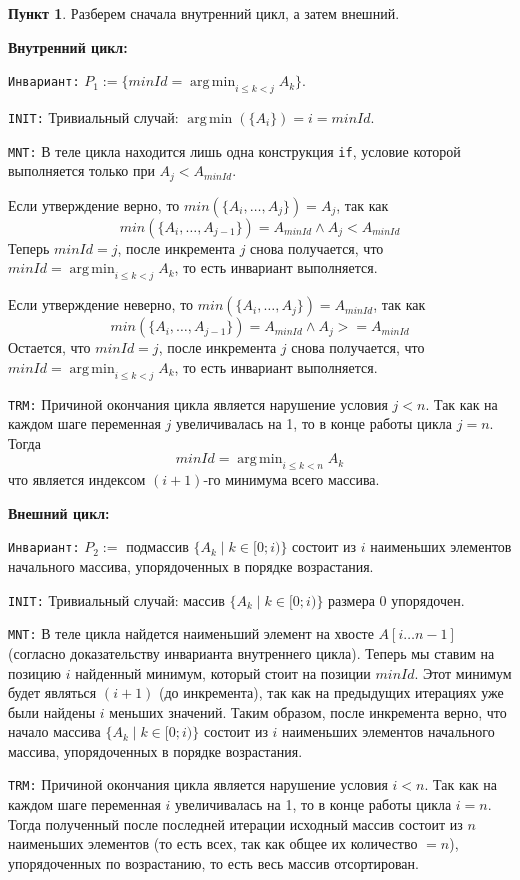 \documentclass[11pt,a4paper]{scrarticle}
\theoremstyle{definition}
\newtheorem{subtask}{Пункт}
\DeclareMathOperator*{\argmin}{arg\,min}
\begin{document}
\begin{subtask}
	Разберем сначала внутренний цикл, а затем внешний.
	
	\textbf{Внутренний цикл:}
	
	\texttt{Инвариант:} $\displaystyle P_{1} := \{minId = \argmin_{i \le k < j} A_k\}$.
	
	\texttt{INIT:} Тривиальный случай: $\argmin (\{A_i\}) = i = minId$.
	
	\texttt{MNT:} В теле цикла находится лишь одна конструкция \texttt{if}, условие которой выполняется только при $A_{j} < A_{minId}$.
	
	Если утверждение верно, то $min(\{A_i, \dots, A_j\}) = A_{j}$, так как
	$$min (\{A_i, \dots, A_{j - 1}\}) = A_{minId} \land A_{j} < A_{minId}$$
	Теперь $minId = j$, после инкремента $j$ снова получается, что $\displaystyle minId = \argmin_{i \le k < j} A_k$, то есть инвариант выполняется.
	
	Если утверждение неверно, то $min(\{A_i, \dots, A_j\}) = A_{minId}$, так как
	$$min (\{A_i, \dots, A_{j - 1}\}) = A_{minId} \land A_{j} >= A_{minId}$$
	Остается, что $minId = j$, после инкремента $j$ снова получается, что $\displaystyle minId = \argmin_{i \le k < j} A_k$, то есть инвариант выполняется.
	
	\texttt{TRM:} Причиной окончания цикла является нарушение условия $j < n$. Так как на каждом шаге переменная $j$ увеличивалась на 1, то в конце работы цикла $j = n$. Тогда
	$$minId = \argmin_{i \le k < n} A_k$$
	что является индексом $(i + 1)$-го минимума всего массива.
	
	\textbf{Внешний цикл:}
	
	\texttt{Инвариант:} $P_2 :=$ подмассив $\{A_k \mid k \in [0; i)\}$ состоит из $i$ наименьших элементов начального массива, упорядоченных в порядке возрастания.
	
	\texttt{INIT:} Тривиальный случай: массив $\{A_k \mid k \in [0; i)\}$ размера $0$ упорядочен.
	
	\texttt{MNT:} В теле цикла найдется наименьший элемент на хвосте $A[i \dots n - 1]$ (согласно доказательству инварианта внутреннего цикла). Теперь мы ставим на позицию $i$ найденный минимум, который стоит на позиции $minId$. Этот минимум будет являться $(i + 1)$ (до инкремента), так как на предыдущих итерациях уже были найдены $i$ меньших значений. Таким образом, после инкремента верно, что начало массива $\{A_k \mid k \in [0; i)\}$ состоит из $i$ наименьших элементов начального массива, упорядоченных в порядке возрастания.
	
	\texttt{TRM:} Причиной окончания цикла является нарушение условия $i < n$. Так как на каждом шаге переменная $i$ увеличивалась на 1, то в конце работы цикла $i = n$. Тогда полученный после последней итерации исходный массив состоит из $n$ наименьших элементов (то есть всех, так как общее их количество $= n$), упорядоченных по возрастанию, то есть весь массив отсортирован.
	
\end{subtask}
\end{document}
